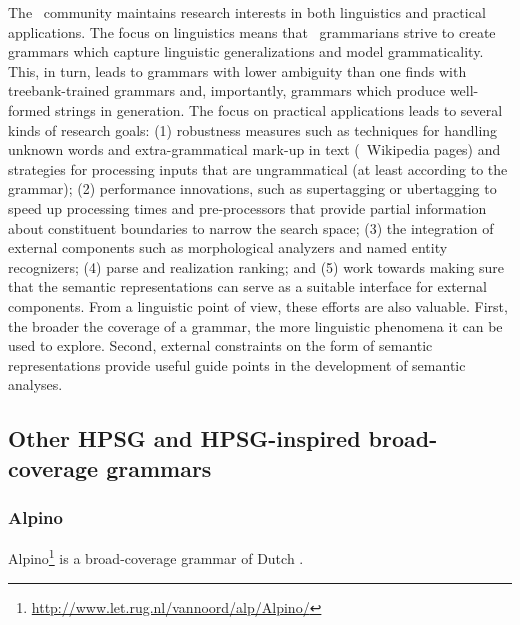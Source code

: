 \documentclass[output=paper,nonflat]{langsci/langscibook}
\begin{document}
The \delphin\ community maintains research interests in both
linguistics and practical applications. The focus on linguistics means
that \delphin\ grammarians strive to create grammars which capture
linguistic generalizations and model grammaticality. This, in turn,
leads to grammars with lower ambiguity than one finds with
treebank-trained grammars and, importantly, grammars which produce
well-formed strings in generation. The focus on practical applications
leads to several kinds of research goals: (1) robustness measures such
as techniques for handling unknown words and extra-grammatical mark-up
in text (\eg\ Wikipedia pages) and strategies for processing inputs
that are ungrammatical (at least according to the grammar); (2)
performance innovations, such as supertagging or ubertagging to speed
up processing times and pre-processors that provide partial
information about constituent boundaries to narrow the search space;
(3) the integration of external components such as morphological
analyzers and named entity recognizers; (4) parse and realization
ranking; and (5) work towards making sure that the semantic
representations can serve as a suitable interface for external
components. 
From a linguistic point of view, these efforts are also valuable.
First, the broader the coverage of a grammar,
the more linguistic phenomena it can be used to explore.
Second, external constraints on the form of semantic representations provide
useful guide points in the development of semantic analyses. 


\subsection{Other HPSG and HPSG-inspired broad-coverage grammars}
\label{cl:othergrammars}

\subsubsection{Alpino}
\label{cl:other:alpino}

Alpino\footnote{%
	\url{http://www.let.rug.nl/vannoord/alp/Alpino/}
}
is a broad-coverage grammar of Dutch \citep{BvNM2001a-u,vannoord2005alpino,vannoord2006alpino}.
\end{document}
